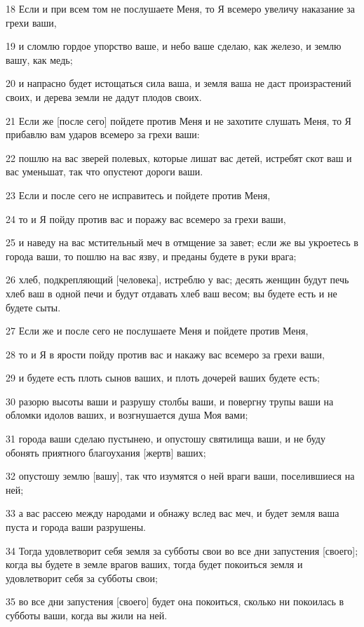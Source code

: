 \par 18 Если и при всем том не послушаете Меня, то Я всемеро увеличу наказание за грехи ваши,
\par 19 и сломлю гордое упорство ваше, и небо ваше сделаю, как железо, и землю вашу, как медь;
\par 20 и напрасно будет истощаться сила ваша, и земля ваша не даст произрастений своих, и дерева земли не дадут плодов своих.
\par 21 Если же [после сего] пойдете против Меня и не захотите слушать Меня, то Я прибавлю вам ударов всемеро за грехи ваши:
\par 22 пошлю на вас зверей полевых, которые лишат вас детей, истребят скот ваш и вас уменьшат, так что опустеют дороги ваши.
\par 23 Если и после сего не исправитесь и пойдете против Меня,
\par 24 то и Я пойду против вас и поражу вас всемеро за грехи ваши,
\par 25 и наведу на вас мстительный меч в отмщение за завет; если же вы укроетесь в города ваши, то пошлю на вас язву, и преданы будете в руки врага;
\par 26 хлеб, подкрепляющий [человека], истреблю у вас; десять женщин будут печь хлеб ваш в одной печи и будут отдавать хлеб ваш весом; вы будете есть и не будете сыты.
\par 27 Если же и после сего не послушаете Меня и пойдете против Меня,
\par 28 то и Я в ярости пойду против вас и накажу вас всемеро за грехи ваши,
\par 29 и будете есть плоть сынов ваших, и плоть дочерей ваших будете есть;
\par 30 разорю высоты ваши и разрушу столбы ваши, и повергну трупы ваши на обломки идолов ваших, и возгнушается душа Моя вами;
\par 31 города ваши сделаю пустынею, и опустошу святилища ваши, и не буду обонять приятного благоухания [жертв] ваших;
\par 32 опустошу землю [вашу], так что изумятся о ней враги ваши, поселившиеся на ней;
\par 33 а вас рассею между народами и обнажу вслед вас меч, и будет земля ваша пуста и города ваши разрушены.
\par 34 Тогда удовлетворит себя земля за субботы свои во все дни запустения [своего]; когда вы будете в земле врагов ваших, тогда будет покоиться земля и удовлетворит себя за субботы свои;
\par 35 во все дни запустения [своего] будет она покоиться, сколько ни покоилась в субботы ваши, когда вы жили на ней.
